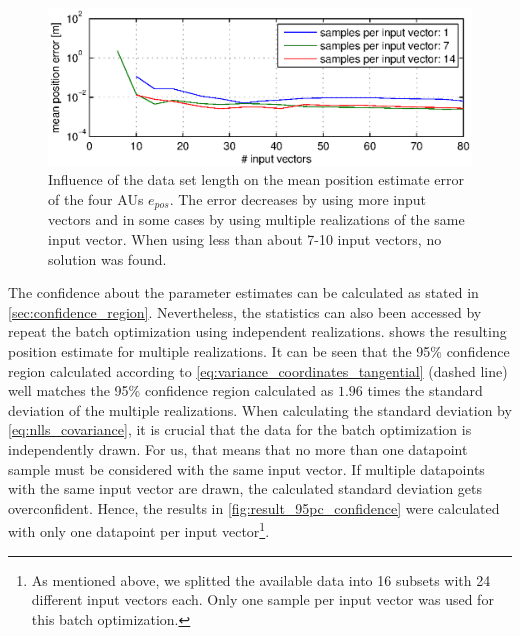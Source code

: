 \begin{figure}[hbtp]
\centering
\includegraphics[width = \textwidth]{images/results/input_length_vs_position_error.eps}
\caption{Influence of the data set length on the mean position estimate error of the four AUs $e_{pos}$. 
The error decreases by using more input vectors and in some cases by using multiple realizations of the same input vector.
When using less than about 7-10 input vectors, no solution was found.}
\label{fig:result_inputlength}
\end{figure}

The confidence about the parameter estimates can be calculated as stated in \cref{sec:confidence_region}.
Nevertheless, the statistics can also been accessed by repeat the batch optimization using independent realizations.
 shows the resulting position estimate for multiple realizations.
It can be seen that the 95\% confidence region calculated according to \cref{eq:variance_coordinates_tangential} (dashed line) well matches the 95\% confidence region calculated as $1.96$ times the standard deviation of the multiple realizations.
When calculating the standard deviation by \cref{eq:nlls_covariance}, it is crucial that the data for the batch optimization is independently drawn.
For us, that means that no more than one datapoint sample must be considered with the same input vector.
If multiple datapoints with the same input vector are drawn, the calculated standard deviation gets overconfident.
Hence, the results in \cref{fig:result_95pc_confidence} were calculated with only one datapoint per input vector\footnote{
As mentioned above, we splitted the available data into 16 subsets with 24 different input vectors each. Only one sample per input vector was used for this batch optimization.}.

